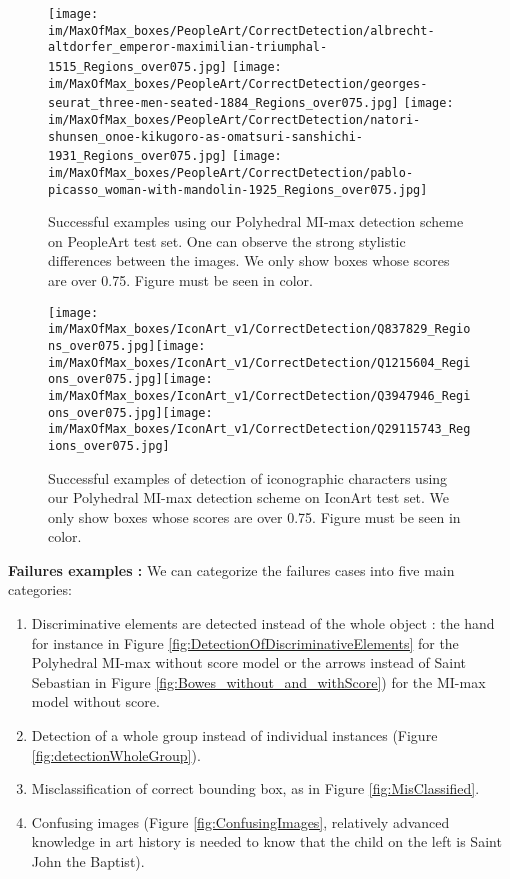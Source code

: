 \documentclass[preprint]{elsarticle}
\newcommand\MILS{MI-max}
\newcommand\MaxOfMaxS{Polyhedral MI-max}
\newcommand\MaxOfMax{Polyhedral MI-max without score}
\newcommand{\heightimageWatercolor}{2cm}
\begin{document}
\begin{figure}
\centering
  \hfill
     \texttt{[image: im/MaxOfMax\_boxes/PeopleArt/CorrectDetection/albrecht-altdorfer\_emperor-maximilian-triumphal-1515\_Regions\_over075.jpg]}\hfill 
     \texttt{[image: im/MaxOfMax\_boxes/PeopleArt/CorrectDetection/georges-seurat\_three-men-seated-1884\_Regions\_over075.jpg]}\hfill
     \texttt{[image: im/MaxOfMax\_boxes/PeopleArt/CorrectDetection/natori-shunsen\_onoe-kikugoro-as-omatsuri-sanshichi-1931\_Regions\_over075.jpg]}\hfill
     \texttt{[image: im/MaxOfMax\_boxes/PeopleArt/CorrectDetection/pablo-picasso\_woman-with-mandolin-1925\_Regions\_over075.jpg]}\hfill
    \caption{Successful examples using our \MaxOfMaxS{} detection scheme on PeopleArt test set. One can observe the strong stylistic differences between the images. We only show boxes whose scores are over 0.75. Figure must be seen in color.}
    \label{fig:PeopleArtSuccessfulDetection}
\end{figure}


\begin{figure}
\centering
  \hfill
      \texttt{[image: im/MaxOfMax\_boxes/IconArt\_v1/CorrectDetection/Q837829\_Regions\_over075.jpg]}\hfill \texttt{[image: im/MaxOfMax\_boxes/IconArt\_v1/CorrectDetection/Q1215604\_Regions\_over075.jpg]}\hfill \texttt{[image: im/MaxOfMax\_boxes/IconArt\_v1/CorrectDetection/Q3947946\_Regions\_over075.jpg]}\hfill  \texttt{[image: im/MaxOfMax\_boxes/IconArt\_v1/CorrectDetection/Q29115743\_Regions\_over075.jpg]}\hfill \caption{Successful examples of detection of iconographic characters using our \MaxOfMaxS{} detection scheme on IconArt test set. We only show boxes whose scores are over 0.75. Figure must be seen in color.}
    \label{fig:IconArtv1SuccessfulDetection}
\end{figure}

{\bf Failures examples :} We can categorize the failures cases into five main categories: 
\begin{enumerate}
\item Discriminative elements are detected instead of the whole object : the hand for instance in Figure \ref{fig:DetectionOfDiscriminativeElements} for the \MaxOfMax{} model or the arrows instead of Saint Sebastian in Figure \ref{fig:Bowes_without_and_withScore}) for the \MILS{} model without score.
\item  Detection of a whole group instead of individual instances (Figure \ref{fig:detectionWholeGroup}).
\item Misclassification of correct bounding box, as in Figure \ref{fig:MisClassified}.
\item Confusing images (Figure \ref{fig:ConfusingImages}, relatively advanced knowledge in art history is needed to know that the child on the left is Saint John the Baptist).
\end{enumerate}
\end{document}
